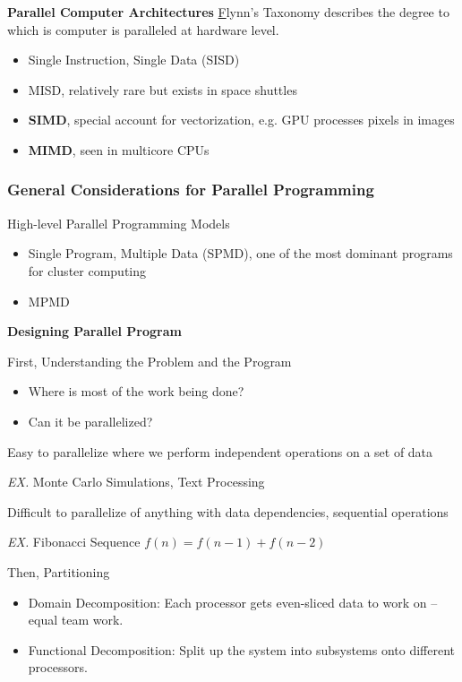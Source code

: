 \documentclass{article}
\begin{document}
\textbf{Parallel Computer Architectures}
{\underline Flynn’s Taxonomy} describes the degree to which is computer is paralleled at hardware level.
\begin{itemize}
    \item Single Instruction, Single Data (SISD)
    \item MISD, relatively rare but exists in space shuttles
    \item \textbf{SIMD}, special account for vectorization, e.g. GPU processes pixels in images
    \item \textbf{MIMD}, seen in multicore CPUs
\end{itemize}

\subsubsection{General Considerations for Parallel Programming}

High-level Parallel Programming Models
\begin{itemize}
    \item Single Program, Multiple Data (SPMD), one of the most dominant programs for cluster computing
    \item MPMD
\end{itemize}

\textbf{Designing Parallel Program}

First, Understanding the Problem and the Program
\begin{itemize}
    \item Where is most of the work being done?
    \item Can it be parallelized?
\end{itemize}

Easy to parallelize where we perform independent operations on a set of data

\textit{EX.} Monte Carlo Simulations, Text Processing

Difficult to parallelize of anything with data dependencies, sequential operations

\textit{EX.} Fibonacci Sequence $f(n) = f(n-1) + f(n-2)$

Then, Partitioning
\begin{itemize}
    \item Domain Decomposition: Each processor gets even-sliced data to work on – equal team work.
    \item Functional Decomposition: Split up the system into subsystems onto different processors.
\end{itemize}
\end{document}
